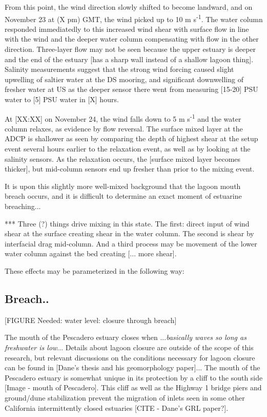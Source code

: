 From this point, the wind direction slowly shifted to become landward,
and on November 23 at (X pm) GMT, the wind picked up to 10 m
s\textsuperscript{-1}. The water column responded immediatedly to this
increased wind shear with surface flow in line with the wind and the
deeper water column compensating with flow in the other direction.
Three-layer flow may not be seen because the upper estuary is deeper and
the end of the estuary [has a sharp wall instead of a shallow lagoon
thing]. Salinity measurements suggest that the strong wind forcing
caused slight upwelling of saltier water at the DS mooring, and
significant downwelling of fresher water at US as the deeper sensor
there went from measuring [15-20] PSU water to [5] PSU water in [X]
hours.

At [XX:XX] on November 24, the wind falls down to 5 m
s\textsuperscript{-1} and the water column relaxes, as evidence by flow
reversal. The surface mixed layer at the ADCP is shallower as seen by
comparing the depth of highest shear at the setup event several hours
earlier to the relaxation event, as well as by looking at the salinity
sensors. As the relaxation occurs, the [surface mixed layer becomes
thicker], but mid-column sensors end up fresher than prior to the mixing
event.

It is upon this slightly more well-mixed background that the lagoon
mouth breach occurs, and it is difficult to determine an exact moment of
estuarine breaching...

*** Three (?) things drive mixing in this state. The first: direct input
of wind shear at the surface creating shear in the water column.  The
second is shear by interfacial drag mid-column. And a third process may
be movement of the lower water column against the bed creating [... more
shear].

These effects may be parameterized in the following way:



\subsection{Breach.. } \label{breach_dynamics}


[FIGURE Needed: water level: closure through breach]

The mouth of the Pescadero estuary closes when ...\emph{basically waves
so long as freshwater is low}... Details about lagoon closure are
outside of the scope of this research, but relevant discussions on the
conditions necessary for lagoon closure can be found in [Dane's thesis
and his geomorphology paper]... The mouth of the Pescadero estuary is
somewhat unique in its protection by a cliff to the south side [Image -
mouth of Pescadero]. This cliff as well as the Highway 1 bridge piers
and {ground/dune stabilization} prevent the migration of inlets seen in
some other California intermittently closed estuaries [CITE - Dane's GRL
paper?].

